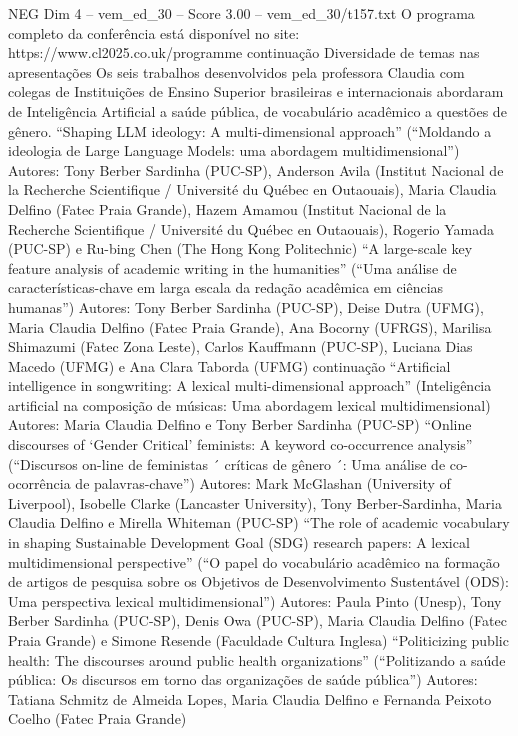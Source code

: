 \begin{textsample}{NEG Dim 4 – vem\_ed\_30 – Score 3.00 – vem\_ed\_30/t157.txt}
O programa completo da conferência está disponível no site: https://www.cl2025.co.uk/programme continuação Diversidade de temas nas apresentações Os seis trabalhos desenvolvidos pela professora Claudia com colegas de Instituições de Ensino Superior brasileiras e internacionais abordaram de Inteligência Artificial a saúde pública, de vocabulário acadêmico a questões de gênero. “Shaping LLM ideology: A multi-dimensional approach” (“Moldando a ideologia de Large Language Models: uma abordagem multidimensional”) Autores: Tony Berber Sardinha (PUC-SP), Anderson Avila (Institut Nacional de la Recherche Scientifique / Université du Québec en Outaouais), Maria Claudia Delfino (Fatec Praia Grande), Hazem Amamou (Institut Nacional de la Recherche Scientifique / Université du Québec en Outaouais), Rogerio Yamada (PUC-SP) e Ru-bing Chen (The Hong Kong Politechnic) “A large-scale key feature analysis of academic writing in the humanities” (“Uma análise de características-chave em larga escala da redação acadêmica em ciências humanas”) Autores: Tony Berber Sardinha (PUC-SP), Deise Dutra (UFMG), Maria Claudia Delfino (Fatec Praia Grande), Ana Bocorny (UFRGS), Marilisa Shimazumi (Fatec Zona Leste), Carlos Kauffmann (PUC-SP), Luciana Dias Macedo (UFMG) e Ana Clara Taborda (UFMG) continuação “Artificial intelligence in songwriting: A lexical multi-dimensional approach” (Inteligência artificial na composição de músicas: Uma abordagem lexical multidimensional) Autores: Maria Claudia Delfino e Tony Berber Sardinha (PUC-SP) “Online discourses of ‘Gender Critical’ feminists: A keyword co-occurrence analysis” (“Discursos on-line de feministas ´ críticas de gênero ´: Uma análise de co-ocorrência de palavras-chave”) Autores: Mark McGlashan (University of Liverpool), Isobelle Clarke (Lancaster University), Tony Berber-Sardinha, Maria Claudia Delfino e Mirella Whiteman (PUC-SP) “The role of academic vocabulary in shaping Sustainable Development Goal (SDG) research papers: A lexical multidimensional perspective” (“O papel do vocabulário acadêmico na formação de artigos de pesquisa sobre os Objetivos de Desenvolvimento Sustentável (ODS): Uma perspectiva lexical multidimensional”) Autores: Paula Pinto (Unesp), Tony Berber Sardinha (PUC-SP), Denis Owa (PUC-SP), Maria Claudia Delfino (Fatec Praia Grande) e Simone Resende (Faculdade Cultura Inglesa) “Politicizing public health: The discourses around public health organizations” (“Politizando a saúde pública: Os discursos em torno das organizações de saúde pública”) Autores: Tatiana Schmitz de Almeida Lopes, Maria Claudia Delfino e Fernanda Peixoto Coelho (Fatec Praia Grande)

\end{textsample}
